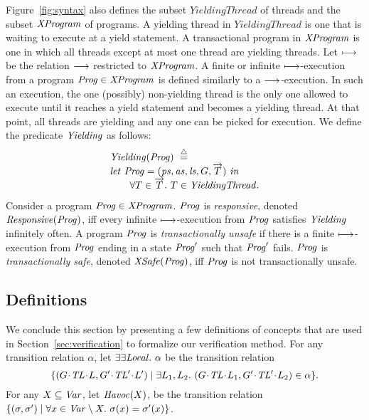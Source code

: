Figure~\ref{fig:syntax} also defines the subset $\mathit{YieldingThread}$ of threads and the subset $\mathit{XProgram}$ of programs.
A yielding thread in $\mathit{YieldingThread}$ is one that is waiting to execute at a yield statement.
A transactional program in $\mathit{XProgram}$ is one in which all threads except at most one thread are yielding threads.
Let $\longmapsto$ be the relation $\longrightarrow$ restricted to $\mathit{XProgram}$.
A finite or infinite $\longmapsto$-execution from a program $\mathit{Prog} \in \mathit{XProgram}$ is defined similarly to a $\longrightarrow$-execution.
In such an execution, the one (possibly) non-yielding thread is the only one allowed to execute until it reaches a yield statement and becomes a yielding thread.
At that point, all threads are yielding and any one can be picked for execution.
We define the predicate $\mathit{Yielding}$ as follows:
\[
\begin{array}{l}
\mathit{Yielding}(\mathit{Prog})\ \stackrel{\triangle}{=} \\
\mathit{let}\ \mathit{Prog} = (\mathit{ps}, \mathit{as}, \mathit{ls}, G, \overrightarrow{T})\ \mathit{in} \\
~~~~~~\forall T \in \overrightarrow{T}.\ T \in \mathit{YieldingThread}.
\end{array}
\]
Consider a program $\mathit{Prog} \in \mathit{XProgram}$.
$\mathit{Prog}$ is {\em responsive\/}, denoted $\mathit{Responsive}(\mathit{Prog})$, 
iff every infinite $\longmapsto$-execution from $\mathit{Prog}$ satisfies $\mathit{Yielding}$ infinitely often.
A program $\mathit{Prog}$ is {\em transactionally unsafe\/} if there is a finite $\longmapsto$-execution from $\mathit{Prog}$ ending in a state $\mathit{Prog}'$ 
such that $\mathit{Prog}'$ fails.
$\mathit{Prog}$ is {\em transactionally safe}, denoted $\mathit{XSafe}(\mathit{Prog})$, iff $\mathit{Prog}$ is not transactionally unsafe.

\subsection{Definitions}
\label{sec:definitions}
We conclude this section by presenting a few definitions of concepts that are used in Section~\ref{sec:verification} to formalize
our verification method.
For any transition relation $\alpha$, let $\exists\exists {\mathit{Local}}.\ \alpha$ be the transition relation
\[\{(\MakeStore{\varsG}{\varsTL}{\varsL}, \MakeStore{\varsG'}{\varsTL'}{\varsL'}) \mid \exists \varsL_1,\varsL_2.\ (\MakeStore{\varsG}{\varsTL}{\varsL_1}, \MakeStore{\varsG'}{\varsTL'}{\varsL_2}) \in \alpha \}.\]
For any $X \subseteq \mathit{Var}$, let $\mathit{Havoc}(X)$, be the transition relation 
$\{(\sigma,\sigma') \mid \forall x \in \mathit{Var} \setminus X.\ \sigma(x) = \sigma'(x)\}$.

